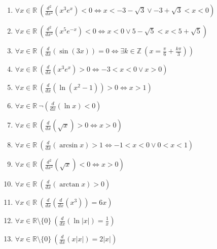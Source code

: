\documentclass[11pt,a4paper]{article}
\begin{document}
\begin{enumerate}
\item $\displaystyle \forall x \in \mathbb{R}\ \left(\frac{d^{2}}{dx^{2}}\left( x^{3}e^{x} \right) < 0 \iff x < -3 - \sqrt{3} \lor -3 + \sqrt{3} < x < 0\right)$
\item $\displaystyle \forall x \in \mathbb{R}\ \left(\frac{d^{2}}{dx^{2}}\left( x^{5}e^{-x} \right) < 0 \iff x < 0 \lor 5 - \sqrt{5} < x < 5 + \sqrt{5}\right)$
\item $\displaystyle \forall x \in \mathbb{R}\ \left(\frac{d}{dx}\left( \sin(3x) \right) = 0 \iff \exists k \in \mathbb{Z}\ \left(x = \frac{\pi}{6} + \frac{k\pi}{3}\right)\right)$
\item $\displaystyle \forall x \in \mathbb{R}\ \left(\frac{d}{dx}\left( x^{3}e^{x} \right) > 0 \iff -3 < x < 0 \lor x > 0\right)$
\item $\displaystyle \forall x \in \mathbb{R}\ \left(\frac{d}{dx}\left( \ln(x^{2} - 1) \right) > 0 \iff x > 1\right)$
\item $\displaystyle \forall x \in \mathbb{R}\ \lnot\left(\frac{d}{dx}\left( \ln x \right) < 0\right)$
\item $\displaystyle \forall x \in \mathbb{R}\ \left(\frac{d}{dx}\left( \sqrt{x} \right) > 0 \iff x > 0\right)$
\item $\displaystyle \forall x \in \mathbb{R}\ \left(\frac{d}{dx}\left( \arcsin x \right) > 1 \iff -1 < x < 0 \lor 0 < x < 1\right)$
\item $\displaystyle \forall x \in \mathbb{R}\ \left(\frac{d^{2}}{dx^{2}}\left( \sqrt{x} \right) < 0 \iff x > 0\right)$
\item $\displaystyle \forall x \in \mathbb{R}\ \left(\frac{d}{dx}\left( \arctan x \right) > 0\right)$
\item $\displaystyle \forall x \in \mathbb{R}\ \left(\frac{d}{dx}\left( \frac{d}{dx}\left( x^{3} \right) \right) = 6x\right)$
\item $\displaystyle \forall x \in \mathbb{R} \setminus \{0\}\ \left(\frac{d}{dx}\left( \ln|x| \right) = \frac{1}{x}\right)$
\item $\displaystyle \forall x \in \mathbb{R} \setminus \{0\}\ \left(\frac{d}{dx}\left( x|x| \right) = 2|x|\right)$
\end{enumerate}
\end{document}
